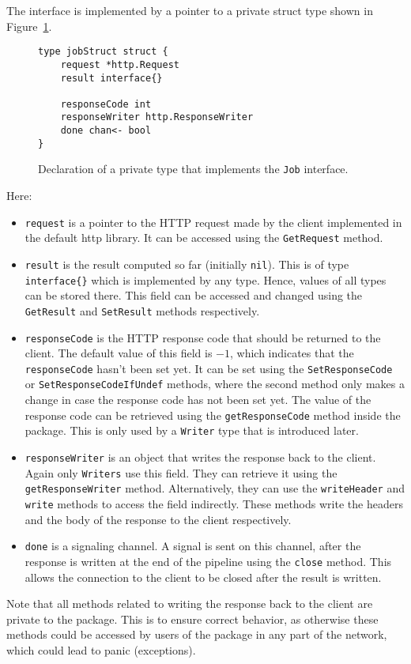 The interface is implemented by a pointer to a private struct type shown in 
Figure~\ref{fig:jobStruct}.
\newpage
\begin{figure}[h]
\centering
\begin{lstlisting}
type jobStruct struct {
    request *http.Request
    result interface{}

    responseCode int
    responseWriter http.ResponseWriter
    done chan<- bool
}
\end{lstlisting}
\caption[scale=1.0]{Declaration of a private type that implements the 
\texttt{Job} interface.}
\label{fig:jobStruct}
\end{figure}
Here:
\begin{itemize}
  \item \texttt{request} is a pointer to the HTTP request made by the 
        client implemented in the default http library. It can be accessed
        using the \texttt{GetRequest} method. 

  \item \texttt{result} is the result computed so far (initially \texttt{nil}). This is
        of type \texttt{interface\{\}} which is implemented by any type.
        Hence, values of all types can be stored there. This field can be
        accessed and changed using the \texttt{GetResult} and \texttt{SetResult}
        methods respectively.
  
  \item \texttt{responseCode} is the HTTP response code that should be 
        returned to the client. The default value of this field is $-1$,
        which indicates that the \texttt{responseCode} hasn't been set yet. 
        It can be set using the \texttt{SetResponseCode} or 
        \texttt{SetResponseCodeIfUndef} methods, where the second method only
        makes a change in case the response code has not been set yet. The value
        of the response code can be retrieved using the \texttt{getResponseCode}
        method inside the package. This is only used by a 
        \texttt{Writer} type that is introduced later.

  \item \texttt{responseWriter} is an object that writes the response back 
        to the client. Again only \texttt{Writers} use this field. They
        can retrieve it using the \texttt{getResponseWriter} method. 
        Alternatively, they can use the \texttt{write\-Header}
        and \texttt{write} methods to access the field indirectly.
        These methods write the headers and 
        the body of the response to the client respectively.

  \item \texttt{done} is a signaling channel. A signal is sent on this channel,
		    after the response is written at the end of the pipeline using the 
        \texttt{close} method. This allows the connection to the client to 
        be closed after the result is written.
\end{itemize}
Note that all methods related to writing the response back to the client
are private to the package. This is to ensure correct behavior, as otherwise
these methods could be accessed by users of the package in any part of the 
network, which could lead to panic (exceptions).

